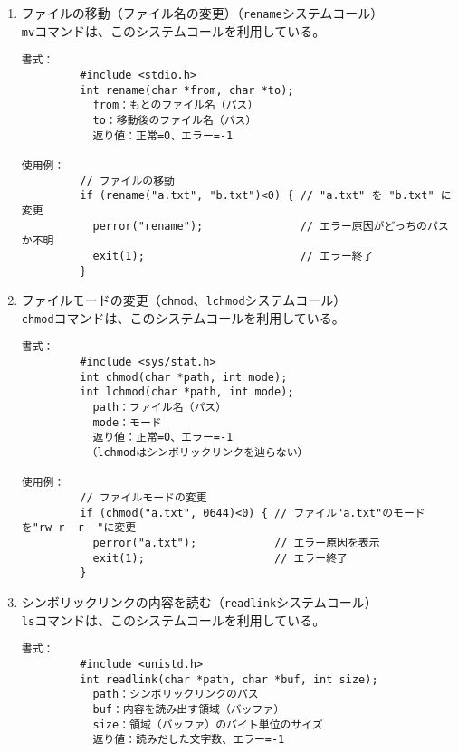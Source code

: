 \documentclass[a4j,dvipdfmx]{jarticle}
\begin{document}
\begin{enumerate}
\begin{lstlisting}[numbers=none]
\end{lstlisting}

\item ファイルの移動（ファイル名の変更）（{\tt rename}システムコール）\\
{\tt mv}コマンドは、このシステムコールを利用している。

\begin{lstlisting}[numbers=none]
書式：
         #include <stdio.h>
         int rename(char *from, char *to);
           from：もとのファイル名（パス）
           to：移動後のファイル名（パス）
           返り値：正常=0、エラー=-1

使用例：
         // ファイルの移動
         if (rename("a.txt", "b.txt")<0) { // "a.txt" を "b.txt" に変更
           perror("rename");               // エラー原因がどっちのパスか不明
           exit(1);                        // エラー終了
         }

\end{lstlisting}

\newpage
\item ファイルモードの変更（{\tt chmod}、{\tt lchmod}システムコール）\\
{\tt chmod}コマンドは、このシステムコールを利用している。

\begin{lstlisting}[numbers=none]
書式：
         #include <sys/stat.h>
         int chmod(char *path, int mode);
         int lchmod(char *path, int mode);
           path：ファイル名（パス）
           mode：モード
           返り値：正常=0、エラー=-1
          （lchmodはシンボリックリンクを辿らない）

使用例：
         // ファイルモードの変更
         if (chmod("a.txt", 0644)<0) { // ファイル"a.txt"のモードを"rw-r--r--"に変更
           perror("a.txt");            // エラー原因を表示
           exit(1);                    // エラー終了
         }

\end{lstlisting}

\item シンボリックリンクの内容を読む（{\tt readlink}システムコール）\\
{\tt ls}コマンドは、このシステムコールを利用している。

\begin{lstlisting}[numbers=none]
書式：
         #include <unistd.h>
         int readlink(char *path, char *buf, int size);
           path：シンボリックリンクのパス
           buf：内容を読み出す領域（バッファ）
           size：領域（バッファ）のバイト単位のサイズ
           返り値：読みだした文字数、エラー=-1


\end{lstlisting}
\end{enumerate}
\end{document}
